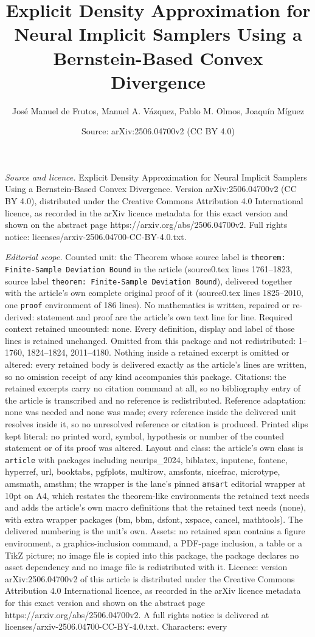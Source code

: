 \documentclass[10pt,a4paper]{amsart}
\title[Explicit Density Approximation for Neural Implicit Samplers ]{Explicit Density Approximation for Neural Implicit Samplers Using a Bernstein-Based Convex Divergence}
\author{Jos\'e Manuel de Frutos, Manuel A. V\'azquez, Pablo M. Olmos, Joaqu\'in M\'iguez}
\date{Source: arXiv:2506.04700v2 (CC BY 4.0)}
\begin{document}
\maketitle

\noindent\emph{Source and licence.} Explicit Density Approximation for Neural Implicit Samplers Using a Bernstein-Based Convex Divergence. Version arXiv:2506.04700v2 (CC BY 4.0), distributed under the Creative Commons Attribution 4.0 International licence, as recorded in the arXiv licence metadata for this exact version and shown on the abstract page https://arxiv.org/abs/2506.04700v2. Full rights notice: licenses/arxiv-2506.04700-CC-BY-4.0.txt.\par\smallskip

\noindent\textit{Editorial scope.} Counted unit: the Theorem whose source label is \texttt{theorem: Finite-Sample Deviation Bound} in the article (source0.tex lines 1761--1823, source label \texttt{theorem: Finite-Sample Deviation Bound}), delivered together with the article's own complete original proof of it (source0.tex lines 1825--2010, one \texttt{proof} environment of 186 lines). No mathematics is written, repaired or re-derived: statement and proof are the article's own text line for line. Required context retained uncounted: none. Every definition, display and label of those lines is retained unchanged. Omitted from this package and not redistributed: 1--1760, 1824--1824, 2011--4180. Nothing inside a retained excerpt is omitted or altered: every retained body is delivered exactly as the article's lines are written, so no omission receipt of any kind accompanies this package. Citations: the retained excerpts carry no citation command at all, so no bibliography entry of the article is transcribed and no reference is redistributed. Reference adaptation: none was needed and none was made; every reference inside the delivered unit resolves inside it, so no unresolved reference or citation is produced. Printed slips kept literal: no printed word, symbol, hypothesis or number of the counted statement or of its proof was altered. Layout and class: the article's own class is \texttt{article} with packages including neurips\_2024, biblatex, inputenc, fontenc, hyperref, url, booktabs, pgfplots, multirow, amsfonts, nicefrac, microtype, amsmath, amsthm; the wrapper is the lane's pinned \texttt{amsart} editorial wrapper at 10pt on A4, which restates the theorem-like environments the retained text needs and adds the article's own macro definitions that the retained text needs (none), with extra wrapper packages (bm, bbm, dsfont, xspace, cancel, mathtools). The delivered numbering is the unit's own. Assets: no retained span contains a figure environment, a graphics-inclusion command, a PDF-page inclusion, a table or a TikZ picture; no image file is copied into this package, the package declares no asset dependency and no image file is redistributed with it. Licence: version arXiv:2506.04700v2 of this article is distributed under the Creative Commons Attribution 4.0 International licence, as recorded in the arXiv licence metadata for this exact version and shown on the abstract page https://arxiv.org/abs/2506.04700v2. A full rights notice is delivered at licenses/arxiv-2506.04700-CC-BY-4.0.txt. Characters: every 
\end{document}

